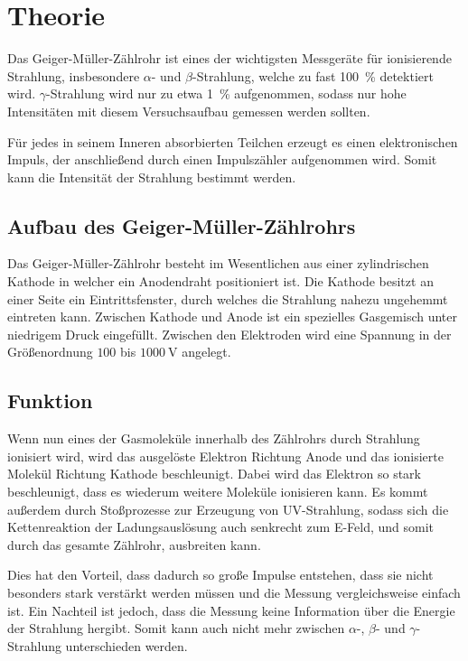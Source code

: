 \section{Theorie}
\label{sec:Theorie}
Das Geiger-Müller-Zählrohr ist eines der wichtigsten Messgeräte für ionisierende Strahlung,
insbesondere $\alpha$- und $\beta$-Strahlung, welche zu fast \SI{100}{\percent} detektiert wird.
$\gamma$-Strahlung wird nur zu etwa \SI{1}{\percent} aufgenommen,
sodass nur hohe Intensitäten mit diesem Versuchsaufbau gemessen werden sollten.

Für jedes in seinem Inneren absorbierten Teilchen erzeugt es einen elektronischen Impuls,
der anschließend durch einen Impulszähler aufgenommen wird.
Somit kann die Intensität der Strahlung bestimmt werden.

\subsection{Aufbau des Geiger-Müller-Zählrohrs}
Das Geiger-Müller-Zählrohr besteht im Wesentlichen aus einer zylindrischen Kathode in welcher ein Anodendraht positioniert ist.
Die Kathode besitzt an einer Seite ein Eintrittsfenster, durch welches die Strahlung nahezu ungehemmt eintreten kann.
Zwischen Kathode und Anode ist ein spezielles Gasgemisch unter niedrigem Druck eingefüllt.
Zwischen den Elektroden wird eine Spannung in der Größenordnung $\num{100}$ bis $\SI{1000}{\volt}$ angelegt.

\subsection{Funktion}
Wenn nun eines der Gasmoleküle innerhalb des Zählrohrs durch Strahlung ionisiert wird, wird das ausgelöste Elektron Richtung Anode und das ionisierte Molekül
Richtung Kathode beschleunigt. Dabei wird das Elektron so stark beschleunigt, dass es wiederum weitere Moleküle ionisieren kann.
Es kommt außerdem durch Stoßprozesse zur Erzeugung von UV-Strahlung, sodass sich die Kettenreaktion der Ladungsauslösung
auch senkrecht zum E-Feld, und somit durch das gesamte Zählrohr, ausbreiten kann.

Dies hat den Vorteil, dass dadurch so große Impulse entstehen, dass sie nicht besonders stark verstärkt werden müssen und die
Messung vergleichsweise einfach ist. Ein Nachteil ist jedoch, dass die Messung keine Information
über die Energie der Strahlung hergibt. Somit kann auch nicht mehr zwischen $\alpha$-, $\beta$- und $\gamma$-Strahlung unterschieden werden.

